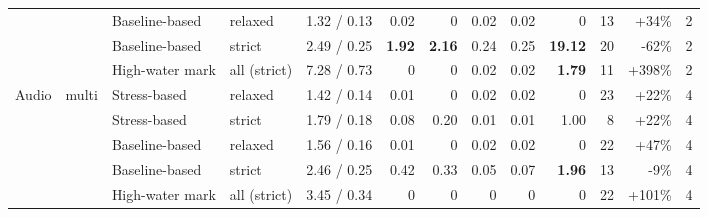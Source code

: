 \begin{longtable}{lllllrrrrrrrr}
 &  & Baseline-based & relaxed & 1.32 / 0.13 & 0.02 & 0 & 0.02 & 0.02 & 0 & 13 & +34\% & 2 \\
 &  & Baseline-based & strict & 2.49 / 0.25 & \textbf{1.92} & \textbf{2.16} & 0.24 & 0.25 & \textbf{19.12} & 20 & -62\% & 2 \\
 &  & High-water mark & all (strict) & 7.28 / 0.73 & 0 & 0 & 0.02 & 0.02 & \textbf{1.79} & 11 & +398\% & 2 \\
\midrule
Audio & multi & Stress-based & relaxed & 1.42 / 0.14 & 0.01 & 0 & 0.02 & 0.02 & 0 & 23 & +22\% & 4 \\
 &  & Stress-based & strict & 1.79 / 0.18 & 0.08 & 0.20 & 0.01 & 0.01 & 1.00 & 8 & +22\% & 4 \\
 &  & Baseline-based & relaxed & 1.56 / 0.16 & 0.01 & 0 & 0.02 & 0.02 & 0 & 22 & +47\% & 4 \\
 &  & Baseline-based & strict & 2.46 / 0.25 & 0.42 & 0.33 & 0.05 & 0.07 & \textbf{1.96} & 13 & -9\% & 4 \\
 &  & High-water mark & all (strict) & 3.45 / 0.34 & 0 & 0 & 0 & 0 & 0 & 22 & +101\% & 4 \\
\end{longtable}
